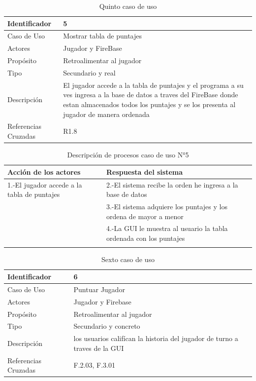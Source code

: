 \begin{table}[H]
    \begin{center}
        \begin{tabular}{| l | m{12cm} |}        
        	\hline 
        	Identificador & 5\\
        	\hline
        	Caso de Uso & Mostrar tabla de puntajes\\
        	\hline
        	Actores & Jugador y FireBase\\
        	\hline
        	Propósito & Retroalimentar al jugador\\
        	\hline
        	Tipo & Secundario y real\\
        	\hline
        	Descripción & El jugador accede a la tabla de puntajes y el programa a su ves ingresa a la base de datos a traves del FireBase donde estan almacenados todos los puntajes y se los presenta al jugador de manera ordenada\\
        	\hline
        	Referencias Cruzadas & R1.8\\
        	\hline
        \end{tabular}
    \caption{Quinto caso de uso}
    \label{Caso_de_uso_5}
    \end{center}
\end{table}

\begin{longtable}[H]{| m{8cm} | m{8cm} |}
\hline 
\textbf{Acción de los actores} & \textbf{Respuesta del sistema}\\
\hline 
1.-El jugador accede a la tabla de puntajes & 2.-El sistema recibe la orden he ingresa a la base de datos\\
\hline
& 3.-El sistema adquiere los puntajes y los ordena de mayor a menor\\
\hline
& 4.-La GUI le muestra al usuario la tabla ordenada con los puntajes\\
\hline
\caption{Descripción de procesos caso de uso N°5}
\end{longtable}

\begin{table}[H]
    \begin{center}
        \begin{tabular}{| l | m{12cm} |}        
        	\hline 
        	Identificador & 6\\
        	\hline
        	Caso de Uso & Puntuar Jugador\\
        	\hline
        	Actores & Jugador y Firebase\\
        	\hline
        	Propósito & Retroalimentar al jugador\\
        	\hline
        	Tipo & Secundario y concreto\\
        	\hline
        	Descripción & los usuarios califícan la historia del jugador de turno a traves de la GUI\\
        	\hline
        	Referencias Cruzadas & F.2.03, F.3.01\\
        	\hline
        \end{tabular}
    \caption{Sexto caso de uso}
    \label{Caso_de_uso_6}
    \end{center}
\end{table}

